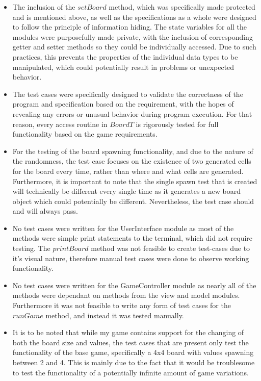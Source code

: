 \documentclass[12pt]{article}
\begin{document}
\begin{itemize}
  \item The inclusion of the $setBoard$ method, which was specifically made protected and is mentioned above, as well as the specifications as a whole were designed to follow the principle of information hiding. The state variables for all the modules were purposefully made private, with the inclusion of corresponding getter and setter methods so they could be individually accessed. Due to such practices, this prevents the properties of the individual data types to be manipulated, which could potentially result in problems or unexpected behavior.

  \item The test cases were specifically designed to validate the correctness of the program and specification based on the requirement, with the hopes of revealing any errors or unusual behavior during program execution. For that reason, every access routine in $BoardT$ is rigorously tested for full functionality based on the game requirements.

  \item For the testing of the board spawning functionality, and due to the nature of the randomness, the test case focuses on the existence of two generated cells for the board every time, rather than where and what cells are generated. Furthermore, it is important to note that the single spawn test that is created will technically be different every single time as it generates a new board object which could potentially be different. Nevertheless, the test case should and will always pass.
  \item No test cases were written for the UserInterface module as most of the methods were simple print statements to the terminal, which did not require testing. The $printBoard$ method was not feasible to create test-cases due to it's visual nature, therefore manual test cases were done to observe working functionality.
  \item No test cases were written for the GameController module as nearly all of the methods were dependant on methods from the view and model modules. Furthermore it was not feasible to write any form of test cases for the $runGame$ method, and instead it was tested manually.

  \item It is to be noted that while my game contains support for the changing of both the board size and values, the test cases that are present only test the functionality of the base game, specifically a 4x4 board with values spawning between 2 and 4. This is mainly due to the fact that it would be troublesome to test the functionality of a potentially infinite amount of game variations.


\end{itemize}
\end{document}
